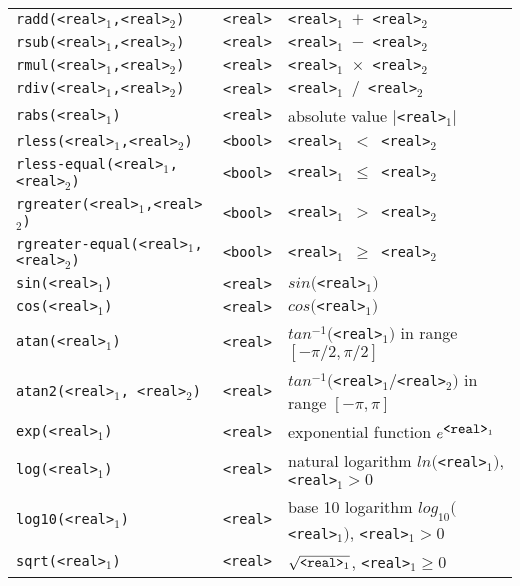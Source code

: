 \documentclass[a4,twoside,noweb]{article} %
\begin{document}
\begin{tabular}{|l|l|p{8cm}|}
 {\tt radd(<real>$_1$,<real>$_2$)}      & {\tt  <real>}  & {\tt <real>$_1$ $+$ <real>$_2$} \\ 
 {\tt rsub(<real>$_1$,<real>$_2$)}      & {\tt  <real>} & {\tt <real>$_1$ $-$ <real>$_2$} \\ 
 {\tt rmul(<real>$_1$,<real>$_2$)}      & {\tt  <real>} & {\tt <real>$_1$ $\times$ <real>$_2$} \\ 
 {\tt rdiv(<real>$_1$,<real>$_2$)}      & {\tt  <real>} & {\tt <real>$_1$ $/$ <real>$_2$} \\
 {\tt rabs(<real>$_1$)}                 & {\tt  <real>}  & absolute value $|${\tt <real>}$_1 |$ \\
 {\tt rless(<real>$_1$,<real>$_2$)}     & {\tt  <bool>} & {\tt <real>$_1$ $<$ <real>$_2$} \\ 
 {\tt rless-equal(<real>$_1$,<real>$_2$)}& {\tt  <bool>} & {\tt <real>$_1$ $\leq$ <real>$_2$} \\ 
 {\tt rgreater(<real>$_1$,<real>$_2$)}  & {\tt  <bool>} & {\tt <real>$_1$ $>$ <real>$_2$} \\ 
 {\tt rgreater-equal(<real>$_1$,<real>$_2$)}& {\tt  <bool>} & {\tt <real>$_1$ $\geq$ <real>$_2$} \\ \hline
 {\tt sin(<real>$_1$)}                  & {\tt  <real>}  & $sin(${\tt <real>}$_1)$ \\ 
 {\tt cos(<real>$_1$)}                  & {\tt  <real>}  & $cos(${\tt <real>}$_1)$ \\ 
 {\tt atan(<real>$_1$)}                 & {\tt  <real>}  & $tan^{-1}(${\tt <real>}$_1)$ in range $[-\pi/2, \pi/2]$ \\ 
 {\tt atan2(<real>$_1$, <real>$_2$)}    & {\tt  <real>}  & $tan^{-1}(${\tt <real>}$_1 / ${\tt <real>}$_2 )$ in range $[-\pi, \pi]$ \\ 
 {\tt exp(<real>$_1$)}                  & {\tt  <real>}  & exponential function $e^{\mbox{{\tt <real>}}_1}$ \\ 
 {\tt log(<real>$_1$)}                  & {\tt  <real>}  & natural logarithm $ln(${\tt <real>}$_1)$, 
                                                           {\tt <real>}$_1 > 0$  \\ 
 {\tt log10(<real>$_1$)}                & {\tt  <real>}  &  base 10 logarithm $log_{10}(${\tt <real>}$_1)$,
                                                           {\tt <real>}$_1 > 0$  \\ 
 {\tt sqrt(<real>$_1$)}                 & {\tt  <real>}  & $\sqrt{\mbox{{\tt <real>}$_1$}}$,
                                                           {\tt <real>}$_1 \geq 0$  \\ \hline
\end{tabular}
\end{document}
